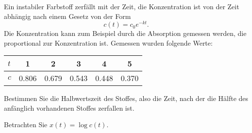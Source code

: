 Ein instabiler Farbstoff zerfällt mit der Zeit, die Konzentration
ist von der Zeit abhängig nach einem Gesetz von der Form
\[
c(t)=c_0e^{-kt}.
\]
Die Konzentration kann zum Beispiel durch die Absorption gemessen
werden, die proportional zur Konzentration ist. Gemessen wurden
folgende Werte:
\begin{center}
\begin{tabular}{|l|ccccc|}
\hline
$t$&1&2&3&4&5
\\
\hline
$c$&0.806&0.679&0.543&0.448&0.370
\\
\hline
\end{tabular}
\end{center}
Bestimmen Sie die Halbwertszeit des Stoffes, also die Zeit, nach
der die Hälfte des anfänglich vorhandenen Stoffes zerfallen ist.

\begin{hinweis}
Betrachten Sie $x(t)=\log c(t)$.
\end{hinweis}

